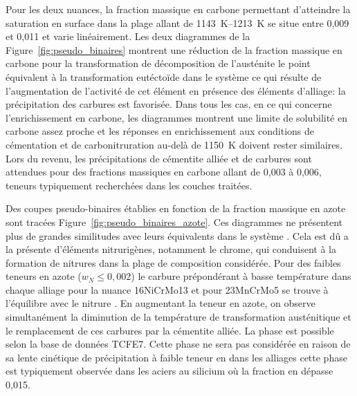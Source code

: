 Pour les deux nuances, la fraction massique en carbone permettant d'atteindre la saturation en surface dans la plage allant de \SIrange{1143}{1213}{\kelvin} se situe entre 0,009 et 0,011 et varie linéairement.  Les deux diagrammes de la Figure~\ref{fig:pseudo_binaires} montrent une réduction de la fraction massique en carbone pour la transformation de décomposition de l'austénite \textendash{} le point équivalent à la transformation eutéctoïde dans le système  \textendash{} ce qui résulte de l'augmentation de l'activité de cet élément en présence des éléments d'alliage: la précipitation des carbures est favorisée. Dans tous les cas, en ce qui concerne l'enrichissement en carbone, les diagrammes montrent une limite de solubilité en carbone assez proche et les réponses en enrichissement aux conditions de cémentation et de carbonitruration au-delà de \SI{1150}{\kelvin} doivent rester similaires. Lors du revenu, les précipitations de cémentite alliée  et de carbures  sont attendues pour des fractions massiques en carbone allant de 0,003 à 0,006, teneurs typiquement recherchées dans les couches traitées.

Des coupes pseudo-binaires établies en fonction de la fraction massique en azote sont tracées Figure~\ref{fig:pseudo_binaires_azote}. Ces diagrammes ne présentent plus de grandes similitudes avec leurs équivalents dans le système . Cela est dû a la présente d'éléments nitrurigènes, notamment le chrome, qui conduisent à la formation de nitrures  dans la plage de composition considérée. Pour des faibles teneurs en azote ($w_{N}\le 0,002$) le carbure prépondérant à basse température dans chaque alliage \textendash{}  pour la nuance 16NiCrMo13 et  pour 23MnCrMo5 \textendash{} se trouve à l'équilibre avec le nitrure . En augmentant la teneur en azote, on observe simultanément la diminution de la température de transformation austénitique et le remplacement de ces carbures par la cémentite alliée. La phase  est possible selon la base de données TCFE7. Cette phase ne sera pas considérée en raison de sa lente cinétique de précipitation à faible teneur en  dans les alliages \textendash{} cette phase est typiquement observée dans les aciers au silicium où la fraction en  dépasse 0,015.

